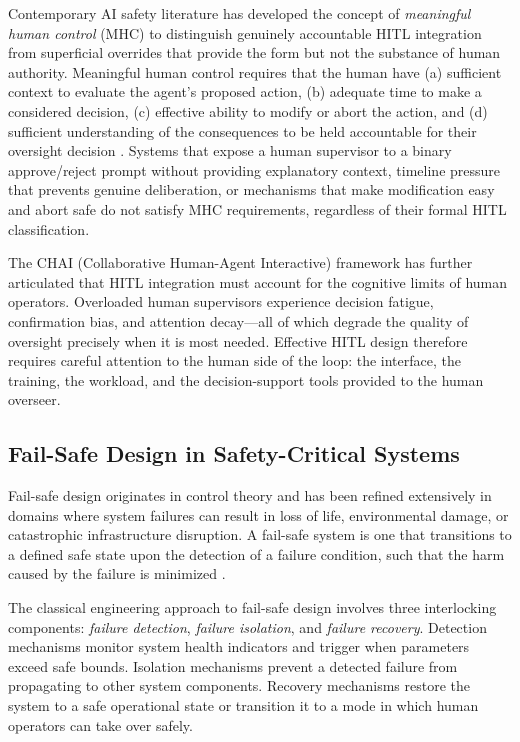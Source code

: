 Contemporary AI safety literature has developed the concept of \emph{meaningful human control} (MHC) to distinguish genuinely accountable HITL integration from superficial overrides that provide the form but not the substance of human authority. Meaningful human control requires that the human have (a) sufficient context to evaluate the agent's proposed action, (b) adequate time to make a considered decision, (c) effective ability to modify or abort the action, and (d) sufficient understanding of the consequences to be held accountable for their oversight decision \cite{bansal2019}. Systems that expose a human supervisor to a binary approve/reject prompt without providing explanatory context, timeline pressure that prevents genuine deliberation, or mechanisms that make modification easy and abort safe do not satisfy MHC requirements, regardless of their formal HITL classification.

The CHAI (Collaborative Human-Agent Interactive) framework has further articulated that HITL integration must account for the cognitive limits of human operators. Overloaded human supervisors experience decision fatigue, confirmation bias, and attention decay—all of which degrade the quality of oversight precisely when it is most needed. Effective HITL design therefore requires careful attention to the human side of the loop: the interface, the training, the workload, and the decision-support tools provided to the human overseer.

\subsection{Fail-Safe Design in Safety-Critical Systems}

Fail-safe design originates in control theory and has been refined extensively in domains where system failures can result in loss of life, environmental damage, or catastrophic infrastructure disruption. A fail-safe system is one that transitions to a defined safe state upon the detection of a failure condition, such that the harm caused by the failure is minimized \cite{wiener1948}.

The classical engineering approach to fail-safe design involves three interlocking components: \emph{failure detection}, \emph{failure isolation}, and \emph{failure recovery}. Detection mechanisms monitor system health indicators and trigger when parameters exceed safe bounds. Isolation mechanisms prevent a detected failure from propagating to other system components. Recovery mechanisms restore the system to a safe operational state or transition it to a mode in which human operators can take over safely.

